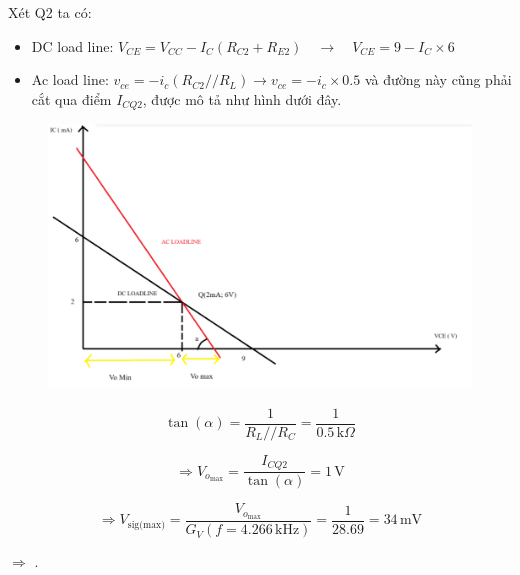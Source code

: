
Xét Q2 ta có:
\begin{itemize}[label=-]
	\item DC load line: $V_{CE} = V_{CC} - I_{C}(R_{C2} + R_{E2}) \quad \rightarrow \quad V_{CE} = 9 - I_{C} \times 6$
	\item Ac load line: $v_{ce} = -i_{c} ( R_{C2} // R_{L})  →  v_{ce} = -i_{c} \times 0.5$   và đường này cũng phải cắt qua điểm $I_{CQ2}$, được mô tả như hình dưới đây.
\end{itemize}

\begin{figure}[H]
	\centering
	\includegraphics[width=.8\linewidth]{./my-chapters/my-images/Question10/c_hinh.png}
\end{figure}

\[
\tan(\alpha) = \frac{1}{R_L // R_C}
= \frac{1}{0.5\,\text{k}\Omega}
\]

\[
\Rightarrow V_{o_{\text{max}}}
= \frac{I_{CQ2}}{\tan(\alpha)}
= 1\,\text{V}
\]

\[
\Rightarrow V_{\text{sig(max)}}
= \frac{V_{o_{\text{max}}}}{G_V(f = 4.266\,\text{kHz})}
= \frac{1}{28.69}
= 34\,\text{mV}
\]

$\Rightarrow$ .


